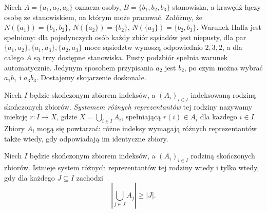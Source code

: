 \begin{przyklad}
Niech $A=\{a_1,a_2,a_3\}$ oznacza osoby,
$B=\{b_1,b_2,b_3\}$ stanowiska, a krawędź
łączy osobę ze stanowiskiem, na którym może pracować.
Załóżmy, że $N(\{a_1\})=\{b_1,b_2\}$,
$N(\{a_2\})=\{b_2\}$, $N(\{a_3\})=\{b_2,b_3\}$.
Warunek Halla jest spełniony: dla pojedynczych osób
każdy zbiór sąsiadów jest niepusty, dla par $\{a_1,a_2\},\{a_1,a_3\},\{a_2,a_3\}$
moce sąsiedztw wynoszą odpowiednio $2,3,2$,
a dla całego $A$ są trzy dostępne stanowiska.
Pusty podzbiór spełnia warunek automatycznie. Jedynym sposobem przypisania $a_2$ jest
$b_2$, po czym można wybrać $a_1b_1$ i $a_3b_3$.
Dostajemy skojarzenie doskonałe.
\end{przyklad}

\begin{center}
\end{center}

\begin{definicja}
Niech $I$ będzie skończonym zbiorem indeksów, a
$(A_i)_{i\in I}$ indeksowaną rodziną skończonych zbiorów.
\emph{Systemem różnych reprezentantów} tej rodziny
nazywamy iniekcję $r:I\to X$, gdzie
$X=\bigcup_{i\in I}A_i$, spełniającą $r(i)\in A_i$
dla każdego $i\in I$. Zbiory $A_i$ mogą się powtarzać:
różne indeksy wymagają różnych reprezentantów także
wtedy, gdy odpowiadają im identyczne zbiory.
\end{definicja}

\begin{wniosek}
\label{cor:tg-hall-sdr}
Niech $I$ będzie skończonym zbiorem indeksów,
a $(A_i)_{i\in I}$ rodziną skończonych zbiorów.
Istnieje system różnych reprezentantów tej rodziny
wtedy i tylko wtedy, gdy dla każdego $J\subseteq I$
zachodzi
\[
\left|\bigcup_{j\in J} A_j\right|\ge |J|.
\]
\end{wniosek}

